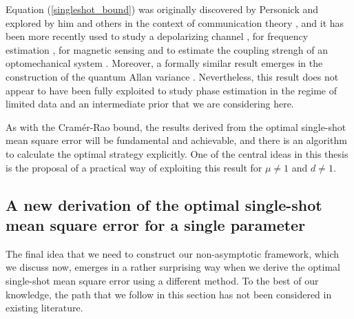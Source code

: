 Equation (\ref{singleshot_bound}) was originally discovered by Personick \cite{personick1969thesis, personick1971} and explored by him and others in the context of communication theory \cite{personick1969thesis, personick1971, helstrom1976}, and it has been more recently used to study a depolarizing channel \cite{mashide2002}, for frequency estimation \cite{macieszczak2014bayesian}, for magnetic sensing \cite{sekatski2017} and to estimate the coupling strengh of an optomechanical system \cite{bernad2018}. Moreover, a formally similar result emerges in the construction of the quantum Allan variance \cite{chabuda2016allanvariance}. Nevertheless, this result does not appear to have been fully exploited to study phase estimation in the regime of limited data and an intermediate prior that we are considering here.

As with the Cram\'{e}r-Rao bound, the results derived from the optimal single-shot mean square error will be fundamental and achievable, and there is an algorithm to calculate the optimal strategy explicitly. One of the central ideas in this thesis is the proposal of a practical way of exploiting this result for $\mu \neq 1$ and $d\neq 1$. 

\subsection{A new derivation of the optimal single-shot mean square error for a single parameter}
\label{subsec:originalderivation}

The final idea that we need to construct our non-asymptotic framework, which we discuss now, emerges in a rather surprising way when we derive the optimal single-shot mean square error using a different method. To the best of our knowledge, the path that we follow in this section has not been considered in existing literature. 

